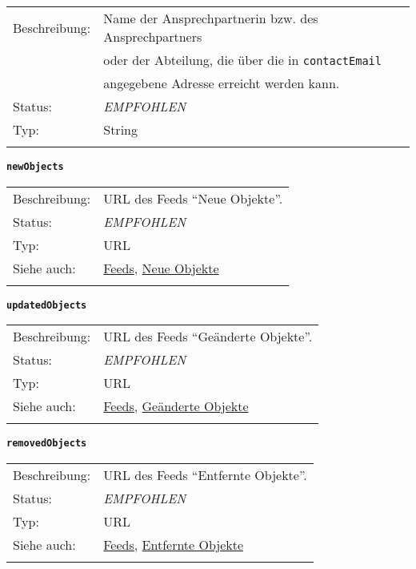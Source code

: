 \documentclass[,a4paper]{article}
\begin{document}
\begin{longtable}[c]{@{}ll@{}}
\toprule\addlinespace
Beschreibung: & Name der Ansprechpartnerin bzw. des Ansprechpartners
\\\addlinespace
& oder der Abteilung, die über die in \texttt{contactEmail}
\\\addlinespace
& angegebene Adresse erreicht werden kann.
\\\addlinespace
Status: & \emph{EMPFOHLEN}
\\\addlinespace
Typ: & String
\\\addlinespace
\bottomrule
\end{longtable}

\textbf{\texttt{newObjects}}

\begin{longtable}[c]{@{}ll@{}}
\toprule\addlinespace
Beschreibung: & URL des Feeds ``Neue Objekte''.
\\\addlinespace
Status: & \emph{EMPFOHLEN}
\\\addlinespace
Typ: & URL
\\\addlinespace
Siehe auch: & \hyperref[feeds]{Feeds},
\hyperref[feedux5fneueux5fobjekte]{Neue Objekte}
\\\addlinespace
\bottomrule
\end{longtable}

\textbf{\texttt{updatedObjects}}

\begin{longtable}[c]{@{}ll@{}}
\toprule\addlinespace
Beschreibung: & URL des Feeds ``Geänderte Objekte''.
\\\addlinespace
Status: & \emph{EMPFOHLEN}
\\\addlinespace
Typ: & URL
\\\addlinespace
Siehe auch: & \hyperref[feeds]{Feeds},
\hyperref[feedux5fgeaenderteux5fobjekte]{Geänderte Objekte}
\\\addlinespace
\bottomrule
\end{longtable}

\textbf{\texttt{removedObjects}}

\begin{longtable}[c]{@{}ll@{}}
\toprule\addlinespace
Beschreibung: & URL des Feeds ``Entfernte Objekte''.
\\\addlinespace
Status: & \emph{EMPFOHLEN}
\\\addlinespace
Typ: & URL
\\\addlinespace
Siehe auch: & \hyperref[feeds]{Feeds},
\hyperref[feedux5fentfernteux5fobjekte]{Entfernte Objekte}
\\\addlinespace
\bottomrule
\end{longtable}
\end{document}
